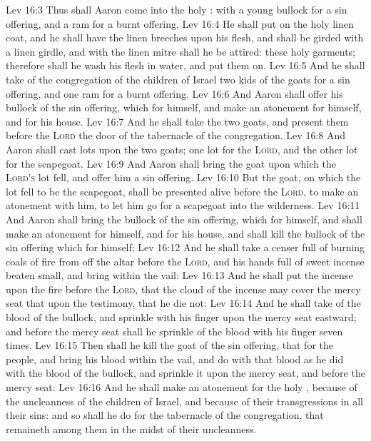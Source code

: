 \vs Lev 16:3 Thus shall Aaron come into the holy : with a young bullock for a sin offering, and a ram for a burnt offering.
\vs Lev 16:4 He shall put on the holy linen coat, and he shall have the linen breeches upon his flesh, and shall be girded with a linen girdle, and with the linen mitre shall he be attired: these  holy garments; therefore shall he wash his flesh in water, and  put them on.
\vs Lev 16:5 And he shall take of the congregation of the children of Israel two kids of the goats for a sin offering, and one ram for a burnt offering.
\vs Lev 16:6 And Aaron shall offer his bullock of the sin offering, which  for himself, and make an atonement for himself, and for his house.
\vs Lev 16:7 And he shall take the two goats, and present them before the \textsc{Lord}  the door of the tabernacle of the congregation.
\vs Lev 16:8 And Aaron shall cast lots upon the two goats; one lot for the \textsc{Lord}, and the other lot for the scapegoat.
\vs Lev 16:9 And Aaron shall bring the goat upon which the \textsc{Lord's} lot fell, and offer him  a sin offering.
\vs Lev 16:10 But the goat, on which the lot fell to be the scapegoat, shall be presented alive before the \textsc{Lord}, to make an atonement with him,  to let him go for a scapegoat into the wilderness.
\vs Lev 16:11 And Aaron shall bring the bullock of the sin offering, which  for himself, and shall make an atonement for himself, and for his house, and shall kill the bullock of the sin offering which  for himself:
\vs Lev 16:12 And he shall take a censer full of burning coals of fire from off the altar before the \textsc{Lord}, and his hands full of sweet incense beaten small, and bring  within the vail:
\vs Lev 16:13 And he shall put the incense upon the fire before the \textsc{Lord}, that the cloud of the incense may cover the mercy seat that  upon the testimony, that he die not:
\vs Lev 16:14 And he shall take of the blood of the bullock, and sprinkle  with his finger upon the mercy seat eastward; and before the mercy seat shall he sprinkle of the blood with his finger seven times.
\vs Lev 16:15 Then shall he kill the goat of the sin offering, that  for the people, and bring his blood within the vail, and do with that blood as he did with the blood of the bullock, and sprinkle it upon the mercy seat, and before the mercy seat:
\vs Lev 16:16 And he shall make an atonement for the holy , because of the uncleanness of the children of Israel, and because of their transgressions in all their sins: and so shall he do for the tabernacle of the congregation, that remaineth among them in the midst of their uncleanness.
